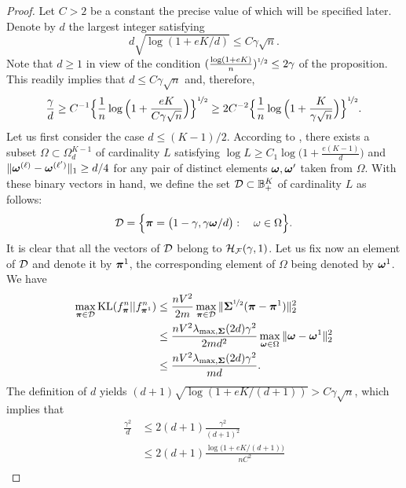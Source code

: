 \begin{proof}
	Let $C>2$ be a constant the precise value of which will be specified later.
	Denote by  $d$ the largest integer satisfying
	\begin{equation}\label{eqFvSxFv}
	d\sqrt{\log(1+eK/d)} \leq C{\gamma\sqrt{n}}.
	\end{equation}
	Note that $d\ge 1$ in view of the condition $(\frac{\log(1+eK)}{n})^{\nicefrac12}\le 2\gamma$ of the 
	proposition. This readily implies that $d\leq C\gamma\sqrt{n}$ and, therefore, 
	\begin{equation}\label{eqFvSxSx}
	\frac{\gamma}{d} 
	\ge C^{-1}\Big\{{\frac1n\log\Big(1+\frac{eK}{C\gamma\sqrt{n}}\Big)}\Big\}^{\nicefrac12}
	\ge 2C^{-2}\Big\{{\frac1n\log\Big(1+\frac{K}{\gamma\sqrt{n}}\Big)}\Big\}^{\nicefrac12}.
	\end{equation}
	Let us first consider the case $d \leq (K-1)/2$. According to , there 
	exists a subset $\Omega \subset \Omega_{d}^{K-1}$ of cardinality $L$ satisfying 
	$\log L\geq C_1\log\big(1+\frac{e(K-1)}{d}\big)$ and $\|\boldsymbol \omega^{(\ell)}-\boldsymbol \omega^{(\ell')}\|_1\geq d/4$
	for any pair of distinct elements $\boldsymbol \omega,\boldsymbol \omega'$ taken from $\Omega$. With these 
	binary vectors in hand, we define the set $\mathcal D \subset {\mathbb B}_+^K$ of cardinality $L$ as follows:
	\begin{equation}
	\mathcal D = \Big\{\boldsymbol \pi = \big(1-\gamma,{\gamma}\boldsymbol \omega/{d}\big) : \quad\omega \in \Omega\Big\}.
	\end{equation}
	It is clear that all the vectors of $\mathcal D$ belong to $\mathcal H_\mathcal F(\gamma,1)$. 
	Let us fix now an element of $\mathcal D$ and denote it by $\boldsymbol \pi^1$, the corresponding element of
	$\Omega$ being denoted by $\boldsymbol \omega^1$. We have
	\begin{align}
	\max_{\boldsymbol \pi\in\mathcal D}{\rm KL}(f^n_{\boldsymbol \pi}||f^n_{\boldsymbol \pi^1})
	&\leq \frac{nV^2}{2m}\max_{\boldsymbol \pi\in\mathcal D} \|\boldsymbol\Sigma^{\nicefrac12}(\boldsymbol \pi-\boldsymbol \pi^{1})\|_2^2 \\
	&\leq \frac{nV^2\lambda_{\max,\boldsymbol\Sigma}(2d)\gamma^2}{2m d^2} \max_{\boldsymbol \omega\in\Omega}
	\|\boldsymbol \omega-\boldsymbol \omega^{1}\|_2^2\\
	&\leq \frac{nV^2\lambda_{\max,\boldsymbol\Sigma}(2d)\gamma^2}{m d}. \label{eqKLlowerBoundInq}
	\end{align}
	The definition of $d$ yields $(d+1)\sqrt{\log(1+eK/(d+1))}> C\gamma\sqrt{n}$, which implies that
	\begin{align}
	\frac{\gamma^2}{d}
	&\leq 2(d+1)\frac{\gamma^2}{(d+1)^2}\nonumber\\
	&\leq 2(d+1)\frac{\log\big(1+eK/(d+1)\big)}{nC^2}\nonumber\\

\end{align}
\end{proof}
